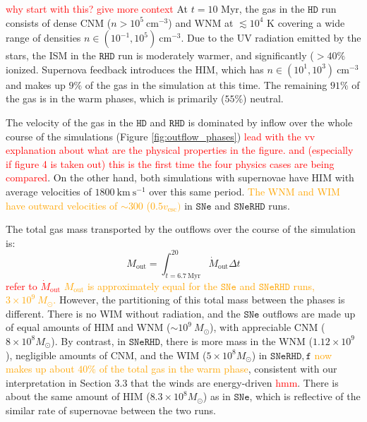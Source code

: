 \documentclass[twocolumn,linenumbers]{aastex631}
\begin{document}
\textcolor{red}{why start with this? give more context} At $t = 10$ Myr, the gas in the $\mathtt{HD}$ run consists of dense CNM ($n > 10^5\ \mathrm{cm^{-3}}$) and WNM at $ \lesssim 10^4$ K covering a wide range of densities $n \in (10^{-1}, 10^5)\ \mathrm{cm^{-3}}$. Due to the UV radiation emitted by the stars, the ISM in the $\mathtt{RHD}$ run is moderately warmer, and significantly ($> 40\%$ ionized. Supernova feedback introduces the HIM, which has $n \in (10^1, 10^3)\ \mathrm{cm^{-3}}$ and makes up $9\%$ of the gas in the simulation at this time. The remaining $91\%$ of the gas is in the warm phases, which is primarily ($55\%$) neutral. 

The velocity of the gas in the $\mathtt{HD}$ and $\mathtt{RHD}$ is dominated by inflow over the whole course of the simulations (Figure \ref{fig:outflow_phases}) \textcolor{red}{lead with the vv explanation about what are the physical properties in the figure. and (especially if figure 4 is taken out) this is the first time the four physics cases are being compared}. On the other hand, both simulations with supernovae have HIM with average velocities of $1800\ \mathrm{km\ s^{-1}}$ over this same period. \textcolor{orange}{The WNM and WIM have outward velocities of $\sim 300$ ($0.5 v_\mathrm{esc})$} in $\mathtt{SNe}$ and $\mathtt{SNeRHD}$ runs.

The total gas mass transported by the outflows over the course of the simulation is: 
\begin{equation}
    M_\mathrm{out} = \int_{t=6.7\ \mathrm{Myr}}^{20} \dot{M}_\mathrm{out} \Delta t
\end{equation}
 \textcolor{red}{refer to $\dot{M}_\mathrm{out}$} \textcolor{orange}{$M_\mathrm{out}$ is approximately equal for the $\mathtt{SNe}$ and $\mathtt{SNeRHD}$ runs, $3\times 10^9\ M_\odot$.} However, the partitioning of this total mass between the phases is different. There is no WIM without radiation, and the $\mathtt{SNe}$ outflows are made up of equal amounts of HIM and WNM ($\sim 10^9\ M_\odot$), with appreciable CNM ($8\times 10^8 M_\odot$). By contrast, in $\mathtt{SNeRHD}$, there is more mass in the WNM ($1.12\times 10^9$), negligible amounts of CNM, and the WIM ($5 \times 10^8 M_\odot$) in $\mathtt{SNeRHD,f}$ \textcolor{orange}{now makes up about $40\%$ of the total gas in the warm phase}, consistent with our interpretation in Section 3.3 that the winds are energy-driven \textcolor{red}{hmm}. There is about the same amount of HIM ($8.3\times 10^8 M_\odot$) as in $\mathtt{SNe}$, which is reflective of the similar rate of supernovae between the two runs.
\end{document}

